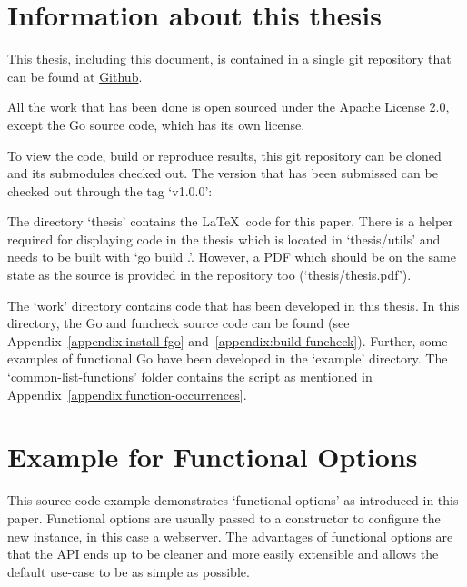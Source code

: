 \section{Information about this thesis}

This thesis, including this document, is contained in a single git repository
that can be found at \href{github.com/tommyknows/bachelor-thesis.git}{Github}.

All the work that has been done is open sourced under the Apache License 2.0,
except the Go source code, which has its own license.

To view the code, build or reproduce results, this git repository can be cloned
and its submodules checked out. The version that has been submissed can be checked
out through the tag `v1.0.0':

The directory `thesis' contains the \LaTeX\ code for this paper. There is a helper
required for displaying code in the thesis which is located in `thesis/utils' and
needs to be built with `go build .'. However, a PDF which should be on the same state
as the source is provided in the repository too (`thesis/thesis.pdf').

The `work' directory contains code that has been developed in this thesis. In this
directory, the Go and funcheck source code can be found (see Appendix~\ref{appendix:install-fgo}
and~\ref{appendix:build-funcheck}). Further, some examples
of functional Go have been developed in the `example' directory. The `common-list-functions'
folder contains the script as mentioned in Appendix~\ref{appendix:function-occurrences}.


\section{Example for Functional Options}\label{appendix:funcopts}

This source code example demonstrates `functional options' as introduced in this paper.
Functional options are usually passed to a constructor to configure the new instance, in
this case a webserver. The advantages of functional options are that the API ends up to
be cleaner and more easily extensible and allows the default use-case to be as simple
as possible.

